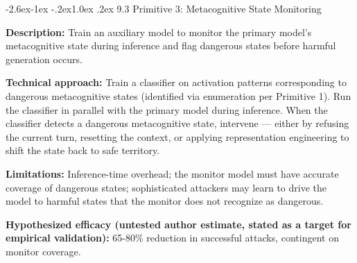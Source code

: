 \documentclass[
  11pt,
]{article}
\makeatletter
\renewcommand\subsection{\@startsection{subsection}{2}{\z@}%
  {-2.6ex\@plus -1ex \@minus -.2ex}{1.0ex \@plus .2ex}%
  {\normalfont\sffamily\large\bfseries}}
\makeatother
\begin{document}
\subsection{9.3 Primitive 3: Metacognitive State
Monitoring}\label{primitive-3-metacognitive-state-monitoring}

\textbf{Description:} Train an auxiliary model to monitor the primary
model's metacognitive state during inference and flag dangerous states
before harmful generation occurs.

\textbf{Technical approach:} Train a classifier on activation patterns
corresponding to dangerous metacognitive states (identified via
enumeration per Primitive 1). Run the classifier in parallel with the
primary model during inference. When the classifier detects a dangerous
metacognitive state, intervene --- either by refusing the current turn,
resetting the context, or applying representation engineering to shift
the state back to safe territory.

\textbf{Limitations:} Inference-time overhead; the monitor model must
have accurate coverage of dangerous states; sophisticated attackers may
learn to drive the model to harmful states that the monitor does not
recognize as dangerous.

\textbf{Hypothesized efficacy (untested author estimate, stated as a target for empirical validation):} 65-80\% reduction in successful attacks,
contingent on monitor coverage.
\end{document}
